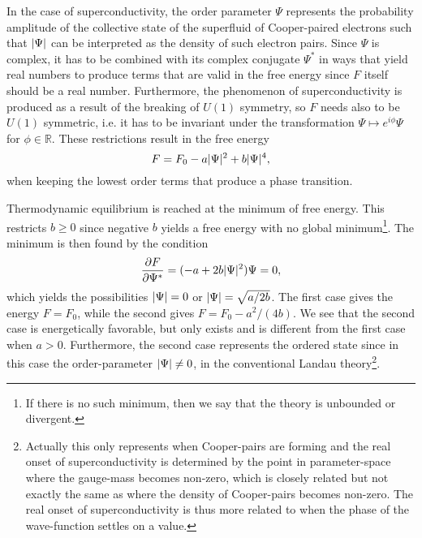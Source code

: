 In the case of superconductivity, the order parameter $\Psi$ represents the probability amplitude of the collective
state of the superfluid of Cooper-paired electrons such that $\lvert \Psi \rvert$ can be interpreted as the density of such
electron pairs. Since $\Psi$ is complex, it has to be combined with its complex conjugate $\Psi^\ast$ in ways that
yield real numbers to produce terms that are valid in the free energy since $F$ itself should be a real number.
Furthermore, the phenomenon of superconductivity is produced as a result of the breaking of $U(1)$ symmetry, so $F$
needs also to be $U(1)$ symmetric, i.e. it has to be invariant under the transformation $\Psi \mapsto e^{i\phi}\Psi$
for $\phi\in\mathbb{R}$. These restrictions result in the free energy
\begin{equation}
    \label{eq:statMech:LandauU1}
    F = F_0 - a\lvert \Psi \rvert^2 + b\lvert \Psi \rvert^4,
\end{equation}
when keeping the lowest order terms that produce a phase transition.

Thermodynamic equilibrium is reached at the minimum of free energy. This restricts $b\geq0$ since negative $b$ yields
a free energy with no global minimum\footnote{If there is no such minimum, then we say that the theory is unbounded or divergent.}.
The minimum is then found by the condition
\begin{equation}
    \label{eq:statMech:LandauExtreme}
    \frac{\partial F}{\partial \Psi^\ast} = (-a + 2b\lvert \Psi \rvert^2)\Psi = 0,
\end{equation}
which yields the possibilities $\lvert \Psi \rvert = 0$ or $\lvert \Psi \rvert = \sqrt{a/2b}$. The first case gives the energy $F = F_0$, while the second
gives $F = F_0 - a^2/(4b)$. We see that the second case is energetically favorable, but only exists and is different from
the first case when $a>0$. Furthermore, the second case represents the ordered state since in this case the order-parameter $\lvert \Psi \rvert \neq 0$,
in the conventional Landau theory\footnote{Actually this only represents when Cooper-pairs are forming and the real onset
of superconductivity is determined by the point in parameter-space where the gauge-mass becomes non-zero, which is closely
related but not exactly the same as where the density of Cooper-pairs becomes non-zero. The real onset of superconductivity is
thus more related to when the phase of the wave-function settles on a value.}.


